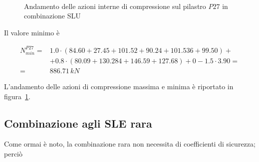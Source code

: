 \begin{figure}
	\centering
	\\
	\caption{Andamento delle azioni interne di compressione sul pilastro $P27$ in combinazione SLU}
	\label{fig:P27axialLoad_slu}
\end{figure}

Il valore minimo è

\begin{align*}
	N_{min}^{P27} =& 1.0\cdot(84.60+27.45+101.52+90.24+101.536+99.50)+\\
	&+0.8\cdot(80.09+130.284+146.59+127.68)+0 -1.5\cdot3.90 =\\
	=& 886.71\,kN
\end{align*}

L'andamento delle azioni di compressione massima e minima è riportato in figura~\ref{fig:P27axialLoad_slu}.

\subsection{Combinazione agli SLE rara}
Come ormai è noto, la combinazione rara non necessita di coefficienti di sicurezza; perciò

